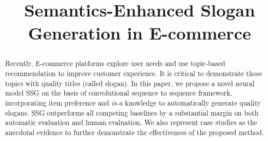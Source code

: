 \documentclass{article}
\title{Semantics-Enhanced Slogan Generation in E-commerce}
\author{
}
\theoremstyle{definition}
\newcommand{\KZ}[1]{\textcolor{red}{Kenny: #1}}
\begin{document}
	\maketitle
	
	\begin{abstract}
		Recently, E-commerce platforms explore user needs and use topic-based recommendation to improve customer experience. 
		It is critical to demonstrate those topics with quality titles (called slogan).
		In this paper, we propose a novel neural model SSG on the basis of convolutional sequence to sequence framework, incorporating item preference and \emph{is-a} knowledge to automatically generate quality slogans.
		SSG outperforms all competing baselines by a substantial margin on both automatic evaluation and human evaluation.
		We also represent case studies as the anecdotal evidence to further	demonstrate the effectiveness of the proposed method.
		
	\end{abstract}




\begin{CJK}{UTF8}{gkai}


%





\end{CJK}



\end{document}
